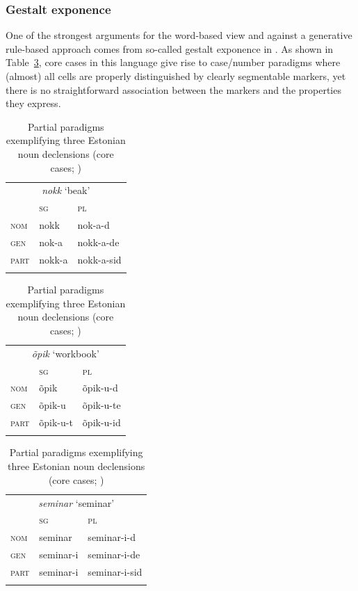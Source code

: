\documentclass[output=paper
 	        ,biblatex
                ,babelshorthands
                ,newtxmath
                ,draftmode
                ,colorlinks, citecolor=brown
]{langscibook}
\begin{document}
\begin{exe}
\begin{xlist}
\begin{exe}
\begin{xlist}
\subsubsection{Gestalt exponence}

One of the strongest arguments for the word-based view and against a
generative rule-based approach comes from so-called gestalt exponence
in  \citep{Blevins05}. As shown in Table~\ref{tab:Estonian},
core cases in this language give rise to case/number paradigms where
(almost) all cells are properly distinguished by clearly segmentable
markers, yet there is no straightforward association between the
markers and the properties they express.   


\begin{table}[htbp]
  \small
  \setlength{\tabcolsep}{.7\tabcolsep}
\begin{tabular}{l|ll}
 \multicolumn{3}{c}{\textit{nokk} `beak'} \\
\lsptoprule
  & \textsc{sg} & \textsc{pl}  \\
  \midrule
  \textsc{nom} & nokk & nok-a-d \\
  \textsc{gen} & nok-a & nokk-a-de\\
  \textsc{part} & nokk-a & nokk-a-sid\\
\lspbottomrule
\end{tabular}
\hfill
\begin{tabular}{l|ll} 
\multicolumn{3}{c}{\textit{õpik} `workbook'}\\
\lsptoprule
  & \textsc{sg} & \textsc{pl}  \\
  \midrule
  \textsc{nom}  & õpik & õpik-u-d\\
  \textsc{gen}  & õpik-u & õpik-u-te\\
  \textsc{part} & õpik-u-t & õpik-u-id \\
\lspbottomrule
\end{tabular}\hfill
\begin{tabular}{l|ll} 
\multicolumn{3}{c}{\textit{seminar} `seminar'}\\
\lsptoprule
  & \textsc{sg} & \textsc{pl}\\
  \midrule
  \textsc{nom}  & seminar & seminar-i-d\\
  \textsc{gen}  & seminar-i & seminar-i-de\\
  \textsc{part} & seminar-i & seminar-i-sid \\
\lspbottomrule
\end{tabular}
\hfill
  \caption{Partial paradigms exemplifying three Estonian noun declensions (core cases; \citealp[287]{Blevins:Ackerman:Malouf:2016})}
\label{tab:Estonian}
\end{table}


\end{xlist}
\end{exe}
\end{xlist}
\end{exe}
\end{document}
